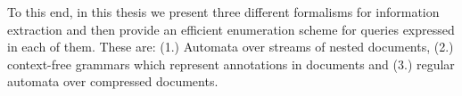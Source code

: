 %
%
%
%

To this end, in this thesis we present three different formalisms for information extraction and then provide an efficient enumeration scheme for queries expressed in each of them. 
These are: (1.) Automata over streams of nested documents, (2.) context-free grammars which represent annotations in documents and (3.) regular automata over compressed documents. 





